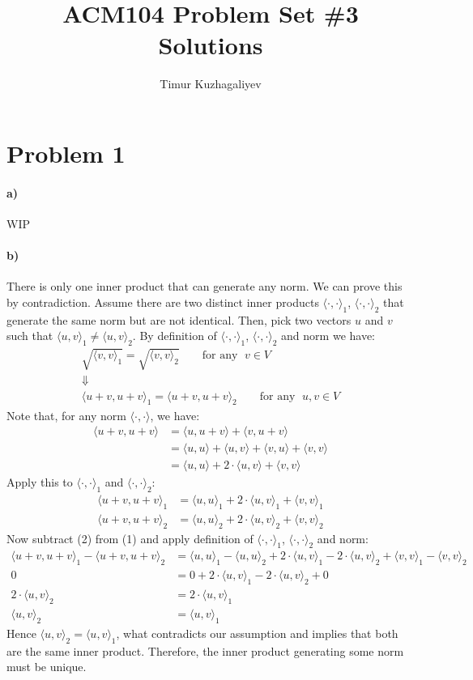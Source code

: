 \documentclass[10pt,letter]{article}
\newcommand{\inner}{\langle\cdot,\cdot\rangle}
\newcommand{\inr}[2]{\langle #1, #2\rangle}
\begin{document}
\title{ACM104 Problem Set \#3 Solutions}

\author{Timur Kuzhagaliyev}

 
\maketitle 

\section*{Problem 1}

\paragraph{a)} WIP

\paragraph{b)} There is only one inner product that can generate any norm. We can prove this by contradiction. Assume there are two distinct inner products $\inner_1$, $\inner_2$ that generate the same norm but are not identical. Then, pick two vectors $u$ and $v$ such that $\inr{u}{v}_1 \neq \inr{u}{v}_2$. By definition of $\inner_1$, $\inner_2$ and norm we have:
\begin{gather*}
\sqrt{\inr{v}{v}_1} = \sqrt{\inr{v}{v}_2} \qquad \textrm{for any } \; v \in V
\\
\Downarrow
\\
\inr{u+v}{u+v}_1 = \inr{u+v}{u+v}_2 \qquad \textrm{for any } \; u,v \in V
\end{gather*}
Note that, for any norm $\inner$, we have:
\begin{align*}
\inr{u+v}{u+v} &= \inr{u}{u+v} + \inr{v}{u+v}
\\ & = \inr{u}{u} + \inr{u}{v} + \inr{v}{u} + \inr{v}{v}
\\ & = \inr{u}{u} + 2\cdot\inr{u}{v} + \inr{v}{v}
\end{align*}
Apply this to $\inner_1$ and $\inner_2$:
\begin{align}
\inr{u+v}{u+v}_1 &= \inr{u}{u}_1 + 2\cdot\inr{u}{v}_1 + \inr{v}{v}_1
\\
\inr{u+v}{u+v}_2 &= \inr{u}{u}_2 + 2\cdot\inr{u}{v}_2 + \inr{v}{v}_2
\end{align}
Now subtract (2) from (1) and apply definition of $\inner_1$, $\inner_2$ and norm:
\begin{align*}
\inr{u+v}{u+v}_1 - \inr{u+v}{u+v}_2 &= \inr{u}{u}_1 - \inr{u}{u}_2 + 2\cdot\inr{u}{v}_1 - 2\cdot\inr{u}{v}_2 + \inr{v}{v}_1 - \inr{v}{v}_2
\\
0 &= 0 + 2\cdot\inr{u}{v}_1 - 2\cdot\inr{u}{v}_2 + 0
\\
2\cdot\inr{u}{v}_2 &= 2\cdot\inr{u}{v}_1
\\
\inr{u}{v}_2 &= \inr{u}{v}_1
\end{align*}
Hence $\inr{u}{v}_2 = \inr{u}{v}_1$, what contradicts our assumption and implies that both are the same inner product. Therefore, the inner product generating some norm must be unique.
\end{document}
